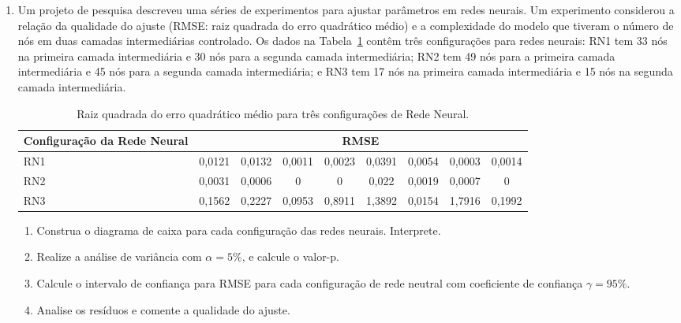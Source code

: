 \documentclass[11pt, a4paper]{article}
\begin{document}
\begin{enumerate}
	\item Um projeto de pesquisa descreveu uma séries de experimentos para ajustar parâmetros em redes neurais. Um experimento considerou a relação da qualidade do ajuste (RMSE: raiz quadrada do erro quadrático médio) e a complexidade do modelo que tiveram o número de nós em duas camadas intermediárias controlado. Os dados na Tabela~\ref{tab:rede-neural} contêm três configurações para redes neurais: RN1 tem 33 nós na primeira camada intermediária e 30 nós para a segunda camada intermediária; RN2 tem 49 nós para a primeira camada intermediária e 45 nós para a segunda camada intermediária; e RN3 tem 17 nós na primeira camada intermediária e 15 nós na segunda camada intermediária. 
	\begin{table}[htbp]
		\centering
		\begin{tabular}{l|cccccccc}
			\toprule[0.05cm]
			Configuração da Rede Neural & \multicolumn{8}{|c}{RMSE}\\
			\midrule[0.025cm]
			RN1 & 0,0121 & 0,0132 & 0,0011 & 0,0023 & 0,0391 & 0,0054 & 0,0003 & 0,0014\\
			RN2 & 0,0031 & 0,0006 & 0 & 0 & 0,022 & 0,0019 & 0,0007 & 0\\
			RN3 & 0,1562 & 0,2227 & 0,0953 & 0,8911 & 1,3892 & 0,0154 & 1,7916 & 0,1992\\
			\bottomrule[0.05cm]
		\end{tabular}
		\caption{Raiz quadrada do erro quadrático médio para três configurações de Rede Neural.}
		\label{tab:rede-neural}
	\end{table}
	\begin{enumerate}
		\item Construa o diagrama de caixa para cada configuração das redes neurais. Interprete.
		\item Realize a análise de variância com $\alpha=5\%$, e calcule o valor-p.
		\item Calcule o intervalo de confiança para RMSE para cada configuração de rede neutral com coeficiente de confiança $\gamma=95\%$.
		\item Analise os resíduos e comente a qualidade do ajuste.
	\end{enumerate}


\end{enumerate}
\end{document}
